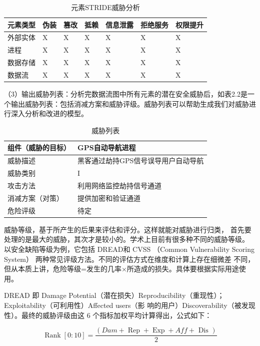  \begin{table}
    \caption{元素STRIDE威胁分析}
  \begin{center}
    \begin{tabular}{|l|l|l|l|l|l|l}
      \hline 元素类型 & 伪装 & 篡改 & 抵赖 & 信息泄露 & 拒绝服务 & 权限提升\\
      \hline 外部实体 & X & X & X & X & X & X \\
      \hline 进程 & X & X & X & X & X & X \\
      \hline 数据存储 & X & X & X & X & X & X \\
      \hline 数据流 & X & X & X & X & X & X \\
      \hline
      \end{tabular}
  \end{center}
\end{table}
  （3）输出威胁列表：分析完数据流图中所有元素的潜在安全威胁后，如表2.2是一个输出威胁列表：包括消减方案和威胁评级。威胁列表可以帮助生成我们对威胁进行深入分析和改进的模型。
\begin{table}
  \caption{威胁列表}
\begin{center}
  \begin{tabular}{|l|l|}
    \hline 组件（威胁的目标） & GPS自动导航进程 \\
    \hline 威胁描述 & 黑客通过劫持GPS信号误导用户自动导航 \\
    \hline 威胁类别 & I \\
    \hline 攻击方法 & 利用网络监控劫持信号通道 \\
    \hline 消减方案（对策） & 提供加密和验证通道 \\
    \hline 危险评级 & 待定 \\
    \hline
    \end{tabular}
\end{center}
\end{table}
威胁等级，基于所产生的后果来评估和评分。这样就能对威胁进行归类，
首先要处理的是最大的威胁，其次才是较小的。学术上目前有很多种不同的威胁等级。
以安全缺陷等级为例，它包括 DREAD和 CVSS （Common Vulnerability Scoring System）
两种常见评级方法。不同的评估方式在维度和计算上存在细微差
不同，但从本质上讲，危险等级=发生的几率×所造成的损失。具体要根据实际用途使用。

DREAD 即 Damage Potential（潜在损失）Reproducibility（重现性）；Exploitability（可利用性）Affected users（影
响的用户）Discoverability（被发现性）。最终的威胁评级由这 6 个指标加权平均计算得出，公式如下：

$$
\operatorname{Rank}[0: 10]=\frac{(D a m+\operatorname{Rep}+\operatorname{Exp}+A f f+\text { Dis })}{2}
$$

